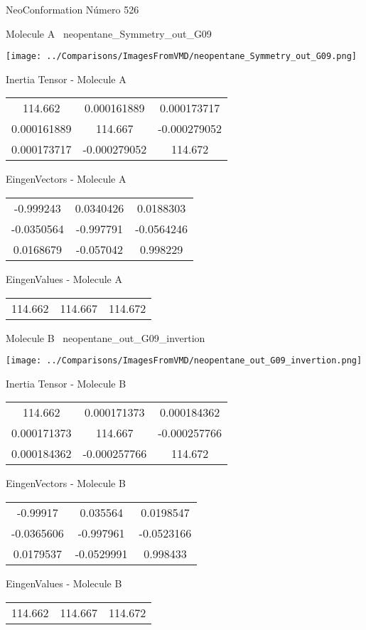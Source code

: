 \vtab[-3cm]
\begin{center}
{\large NeoConformation \tab Número 526}
\end{center}
\begin{multicols}{2}
\begin{center}

Molecule A \
neopentane\_Symmetry\_out\_G09

\texttt{[image: ../Comparisons/ImagesFromVMD/neopentane\_Symmetry\_out\_G09.png]}

Inertia Tensor - Molecule A \\
\begin{tabular}{|c c c|}
114.662	 & 	0.000161889	 & 	0.000173717	 \\
0.000161889	 & 	114.667	 & 	-0.000279052	 \\
0.000173717	 & 	-0.000279052	 & 	114.672
\end{tabular}

\vtab
 EingenVectors - Molecule A     \\
\begin{tabular}{|c c c|}
-0.999243	 & 	0.0340426	 & 	0.0188303	 \\
-0.0350564	 & 	-0.997791	 & 	-0.0564246	 \\
0.0168679	 & 	-0.057042	 & 	0.998229
\end{tabular}

\vtab
 EingenValues - Molecule A     \\
\begin{tabular}{|c c c|}
114.662	 & 	114.667	 & 	114.672	 \\
\end{tabular}
\columnbreak

Molecule B \
neopentane\_out\_G09\_invertion

\texttt{[image: ../Comparisons/ImagesFromVMD/neopentane\_out\_G09\_invertion.png]}

Inertia Tensor - Molecule B \\
\begin{tabular}{|c c c|}
114.662	 & 	0.000171373	 & 	0.000184362	 \\
0.000171373	 & 	114.667	 & 	-0.000257766	 \\
0.000184362	 & 	-0.000257766	 & 	114.672
\end{tabular}

\vtab
 EingenVectors - Molecule B     \\
\begin{tabular}{|c c c|}
-0.99917	 & 	0.035564	 & 	0.0198547	 \\
-0.0365606	 & 	-0.997961	 & 	-0.0523166	 \\
0.0179537	 & 	-0.0529991	 & 	0.998433
\end{tabular}

\vtab
 EingenValues - Molecule B     \\
\begin{tabular}{|c c c|}
114.662	 & 	114.667	 & 	114.672	 \\
\end{tabular}

\end{center}
\end{multicols}

